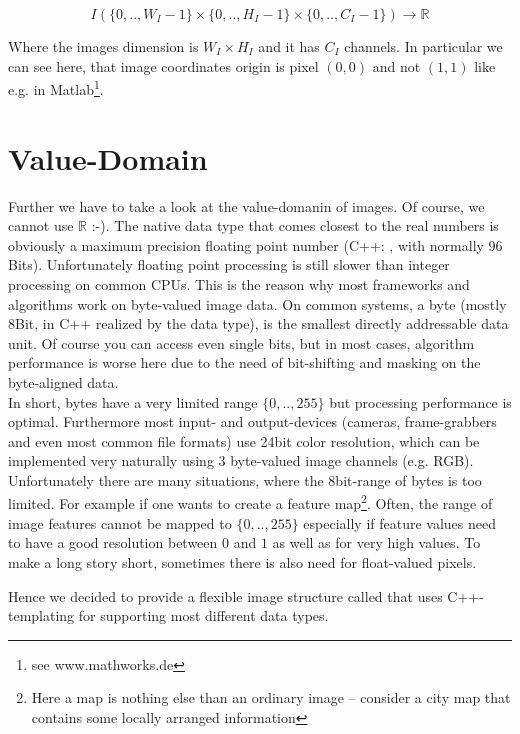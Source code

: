 \begin{equation}
  I(\{0,..,W_I-1\} \times{} \{0,..,H_I-1\} \times{} \{0,..,C_I-1\} ) \rightarrow \mathbb{R} 
\end{equation}


Where the images dimension is $W_I \times{}H_I$ and it has $C_I$ channels. In particular we can see here, that image coordinates origin is pixel $(0,0)$ and not $(1,1)$ like e.g. in Matlab\footnote{see www.mathworks.de}. 


\section{Value-Domain}
Further we have to take a look at the value-domanin of images.
Of course, we cannot use $\mathbb{R}$ :-). The native data type that comes closest to the real numbers is obviously a maximum precision floating point number (C++: , with normally 96 Bits). Unfortunately floating point processing is still slower than integer processing on common CPUs. This is the reason why most frameworks and algorithms work on byte-valued image data. On common systems, a byte (mostly 8Bit, in C++ realized by the  data type), is the smallest directly addressable data unit. Of course you can access even single bits, but in most cases, algorithm performance is worse here due to the need of bit-shifting and masking on the byte-aligned data.\\
In short, bytes have a very limited range $\{0,..,255\}$ but processing performance is optimal. Furthermore most input- and output-devices (cameras, frame-grabbers and even most common file formats) use 24bit color resolution, which can be implemented very naturally using 3 byte-valued image channels (e.g. RGB).
Unfortunately there are many situations, where the 8bit-range of bytes is too limited. For example if one wants to create a feature map\footnote{Here a map is nothing else than an ordinary image -- consider a city map that contains some locally arranged information}. Often, the range of image features cannot be mapped to $\{0,..,255\}$ especially if feature values need to have a good resolution between $0$ and $1$ as well as for very high values. To make a long story short, sometimes there is also need for float-valued pixels.

Hence we decided to provide a flexible image structure called  that uses C++-templating for supporting most different data types.

